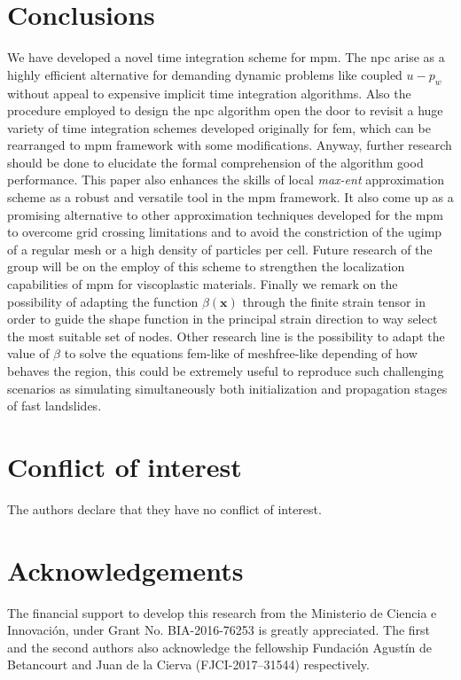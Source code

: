 \documentclass[preprint,12pt,a4paper]{elsarticle}
\newcommand{\vect}[1]{
  \ensuremath{\mathbf{{#1}}}
}
\begin{document}
\section{Conclusions}
\label{sec:conclusions}
We have developed a novel time integration scheme for
\acrshort{mpm}. The \acrshort{npc} arise as a highly efficient
alternative for demanding dynamic problems like coupled $u-p_w$
without appeal to expensive implicit time integration algorithms. Also
the procedure employed to design the \acrshort{npc} algorithm open the
door to revisit a huge variety of time integration schemes developed
originally for \acrshort{fem}, which can be rearranged to
\acrshort{mpm} framework with some modifications. Anyway, further
research should be done to elucidate the formal comprehension of the
algorithm good performance. This paper also enhances the skills of
local \textit{max-ent} approximation scheme as a robust and versatile
tool in the \acrshort{mpm} framework. It also come up as a promising
alternative to other approximation techniques developed for the
\acrshort{mpm} to overcome grid crossing limitations and to avoid the
constriction of the \acrshort{ugimp} of a regular mesh or a high
density of particles per cell. Future research of the group will be on
the employ of this scheme to strengthen the localization capabilities of
\acrshort{mpm} for viscoplastic materials. Finally we remark on the
possibility of adapting the function $\beta(\vect{x})$ through the finite strain
tensor in order to guide the shape function in the principal strain
direction to way select the most suitable set of nodes. Other
research line is the possibility to adapt the value of $\beta$ to solve the equations
\acrshort{fem}-like of meshfree-like depending of how behaves the
region, this could be extremely useful to reproduce such challenging
scenarios as simulating simultaneously both initialization and
propagation stages of fast landslides.
% 
\section*{Conflict of interest}
%
The authors declare that they have no conflict of interest.

% 
\section*{Acknowledgements}
%
The financial support to develop this research from the Ministerio de Ciencia e Innovaci\'on, under Grant No. BIA-2016-76253 is greatly appreciated. The first and the second authors also acknowledge the fellowship Fundaci\'on Agust\'in de Betancourt and Juan de la Cierva (FJCI-2017–31544) respectively.
\end{document}
